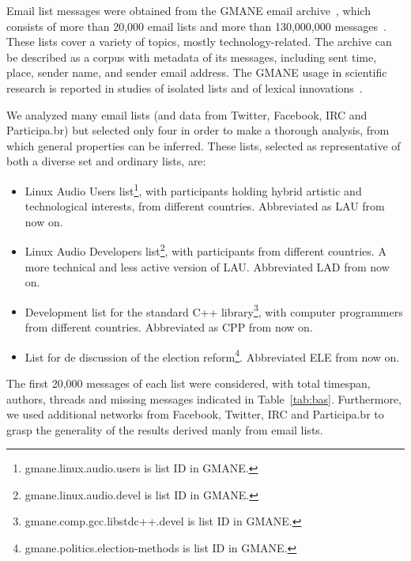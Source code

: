 \documentclass[%
 aip,
 jmp,%
 amsmath,amssymb,
 reprint,%
]{revtex4-1}
\begin{document}
Email list messages were obtained from
the GMANE email archive~\cite{gmanePack}, which consists of more than 20,000 email lists and more than 130,000,000 messages~\cite{GMANEwikipedia}. These lists cover a variety of topics, mostly technology-related. The archive can be described as a corpus with metadata of its messages, including sent time, place, sender name, and sender email address.
The GMANE usage in scientific research is reported in studies of isolated lists and of lexical innovations~\cite{GMANE2,bird}. 

We analyzed many email lists (and data from Twitter, Facebook, IRC and Participa.br) but selected only four in order to make a thorough analysis, from which general properties can be inferred. These lists, selected as representative of both a diverse set and ordinary lists, are:
\begin{itemize}
	\item Linux Audio Users list\footnote{gmane.linux.audio.users is list ID in GMANE.}, with participants holding hybrid artistic and technological interests, from different countries. Abbreviated as LAU from now on.
	\item Linux Audio Developers list\footnote{gmane.linux.audio.devel is list ID in GMANE.}, with participants from different countries. A more technical and less active version of LAU. Abbreviated LAD from now on.
	\item Development list for the standard C++ library\footnote{gmane.comp.gcc.libstdc++.devel is list ID in GMANE.}, with computer programmers from different countries. Abbreviated as CPP from now on.
	\item List for de discussion of the election reform\footnote{gmane.politics.election-methods is list ID in GMANE.}.
		Abbreviated ELE from now on.
\end{itemize} 
The first 20,000 messages of each list were considered, with total timespan, authors, threads and missing messages indicated in Table~\ref{tab:bas}.
Furthermore, we used additional networks from Facebook, Twitter, IRC and Participa.br to grasp the generality of the results derived manly from email lists.

%		
\end{document}

